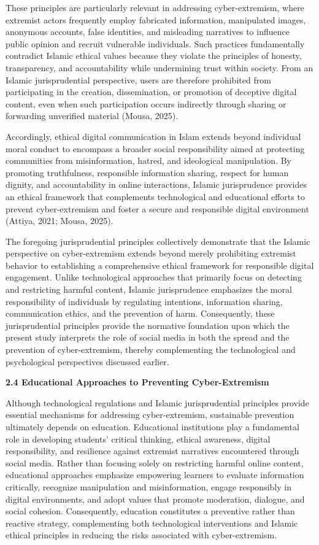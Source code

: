 \documentclass[11pt,a4paper]{article}
\begin{document}
	These principles are particularly relevant in addressing cyber-extremism, where extremist actors frequently employ fabricated information, manipulated images, anonymous accounts, false identities, and misleading narratives to influence public opinion and recruit vulnerable individuals. Such practices fundamentally contradict Islamic ethical values because they violate the principles of honesty, transparency, and accountability while undermining trust within society. From an Islamic jurisprudential perspective, users are therefore prohibited from participating in the creation, dissemination, or promotion of deceptive digital content, even when such participation occurs indirectly through sharing or forwarding unverified material (Mousa, 2025).
	
	Accordingly, ethical digital communication in Islam extends beyond individual moral conduct to encompass a broader social responsibility aimed at protecting communities from misinformation, hatred, and ideological manipulation. By promoting truthfulness, responsible information sharing, respect for human dignity, and accountability in online interactions, Islamic jurisprudence provides an ethical framework that complements technological and educational efforts to prevent cyber-extremism and foster a secure and responsible digital environment (Attiya, 2021; Mousa, 2025).
	
	The foregoing jurisprudential principles collectively demonstrate that the Islamic perspective on cyber-extremism extends beyond merely prohibiting extremist behavior to establishing a comprehensive ethical framework for responsible digital engagement. Unlike technological approaches that primarily focus on detecting and restricting harmful content, Islamic jurisprudence emphasizes the moral responsibility of individuals by regulating intentions, information sharing, communication ethics, and the prevention of harm. Consequently, these jurisprudential principles provide the normative foundation upon which the present study interprets the role of social media in both the spread and the prevention of cyber-extremism, thereby complementing the technological and psychological perspectives discussed earlier.
	
	\textbf{2.4 Educational Approaches to Preventing Cyber-Extremism}
	
	Although technological regulations and Islamic jurisprudential principles provide essential mechanisms for addressing cyber-extremism, sustainable prevention ultimately depends on education. Educational institutions play a fundamental role in developing students' critical thinking, ethical awareness, digital responsibility, and resilience against extremist narratives encountered through social media. Rather than focusing solely on restricting harmful online content, educational approaches emphasize empowering learners to evaluate information critically, recognize manipulation and misinformation, engage responsibly in digital environments, and adopt values that promote moderation, dialogue, and social cohesion. Consequently, education constitutes a preventive rather than reactive strategy, complementing both technological interventions and Islamic ethical principles in reducing the risks associated with cyber-extremism.
	
\end{document}
